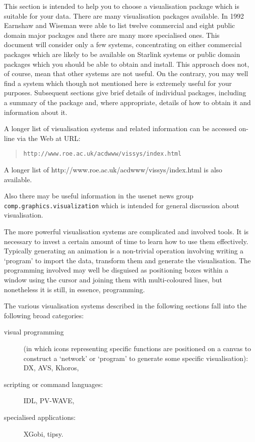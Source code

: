 This section is intended to help you to choose a visualisation package
which is suitable for your data. There are many visualisation packages
available. In 1992 Earnshaw and Wiseman\cite{EARNSHAW} were able to
list twelve commercial and eight public domain major packages and there
are many more specialised ones. This document will consider only a few
systems, concentrating on either commercial packages which are likely to
be available on Starlink systems or public domain packages which you
should be able to obtain and install. This approach does not, of course,
mean that other systems are not useful. On the contrary, you may well
find a system which though not mentioned here is extremely useful for
your purposes. Subsequent sections give brief details of individual
packages, including a summary of the package and, where appropriate,
details of how to obtain it and information about it.
\begin{latex}
A longer list of visualisation systems and related information can
be accessed on-line via the Web at URL:
\begin{quote}
{\tt http://www.roe.ac.uk/acdwww/vissys/index.html}
\end{quote}
\end{latex}
\begin{htmlonly}
A longer list of 
{http://www.roe.ac.uk/acdwww/vissys/index.html} is also available.
\end{htmlonly}
Also there may be useful information in the usenet news group {\tt
comp.graphics.visualization} which is intended for general discussion
about visualisation.

The more powerful visualisation systems are complicated and involved
tools. It is necessary to invest a certain amount of time to learn how
to use them effectively. Typically generating an animation is a
non-trivial operation involving writing a `program' to import the data,
transform them and generate the visualisation. The programming involved
may well be disguised as positioning boxes within a window using the
cursor and joining them with multi-coloured lines, but nonetheless it is
still, in essence, programming.

The various visualisation systems described in the following sections 
fall into the following broad categories:

\begin{description}

  \item[visual programming] (in which icons representing specific
   functions are positioned on a canvas to construct a `network' or
   `program' to generate some specific visualisation): DX, AVS,
   Khoros,

  \item[scripting or command languages:] IDL, PV-WAVE,

  \item[specialised applications:] XGobi, tipsy.

\end{description}

